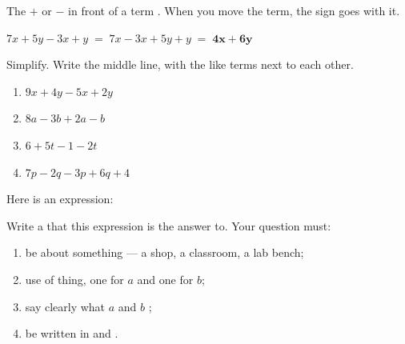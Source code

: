 \documentclass[12pt,a4paper]{article}
\begin{document}

\begin{remember}
  The $+$ or $-$ in front of a term . When you move the
  term, the sign goes with it.

  \smallskip
  \hspace*{1.2em}$7x + 5y - 3x + y \;=\; 7x - 3x + 5y + y \;=\; \mathbf{4x + 6y}$
\end{remember}

\noindent Simplify. Write the middle line, with the like terms next to each other.

\vspace{4pt}
\begin{enumerate}[label=(\alph*), itemsep=10pt]
  \item $9x + 4y - 5x + 2y$ \hfill \blank[6.6cm]
  \item $8a - 3b + 2a - b$ \hfill \blank[6.6cm]
  \item $6 + 5t - 1 - 2t$ \hfill \blank[6.6cm]
  \item $7p - 2q - 3p + 6q + 4$ \hfill \blank[6.6cm]
\end{enumerate}

%

\begin{yourturn}
  Here is an expression:\qquad {}

  \medskip
  Write a  that this expression is the answer to. Your question
  must:
  \begin{enumerate}[label=\arabic*., itemsep=4pt, topsep=5pt]
    \item be about something  --- a shop, a classroom, a lab bench;
    \item use  of thing, one for $a$ and one for $b$;
    \item say clearly what $a$ and $b$ ;
    \item be written in  and .
  \end{enumerate}
\end{yourturn}
\end{document}
